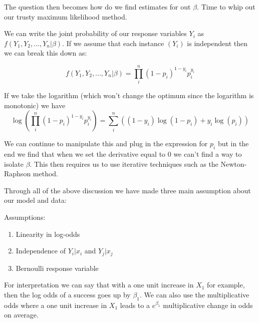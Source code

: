 The question then becomes how do we find estimates for out $\beta$. Time to whip out our trusty maximum likelihood method.

We can write the joint probability of our response variables $Y_i$ as $f(Y_1, Y_2, ..., Y_n | \beta)$. If we assume that each instance $(Y_i)$ is independent then we can break this down as:

\begin{equation}
f(Y_1, Y_2, ..., Y_n | \beta) = \prod_i^{n} (1-p_i)^{1-y_i} p_i^{y_i}
\end{equation} 

If we take the logarithm (which won't change the optimum since the logarithm is monotonic) we have
\begin{equation}
\log(\prod_i^{n} (1-p_i)^{1-y_i} p_i^{y_i}) = \sum_i^n ((1-y_i)\log(1-p_i) + y_i\log(p_i)) 
\end{equation} 

We can continue to manipulate this and plug in the expression for $p_i$ but in the end we find that when we set the derivative equal to 0 we can't find a way to isolate $\beta$. This then requires us to use iterative techniques such as the Newton-Raphson method. 

Through all of the above discussion we have made three main assumption about our model and data:

Assumptions:
\begin{enumerate}
\item Linearity in log-odds
\item Independence of $Y_i|x_i$ and $Y_j|x_j$
\item Bernoulli response variable
\end{enumerate}

For interpretation we can say that with a one unit increase in $X_1$ for example, then the log odds of a success goes up by $\beta_1$. We can also use the multiplicative odds where a one unit increase in $X_1$ leads to a $e^{\beta_1}$ multiplicative change in odds on average.


